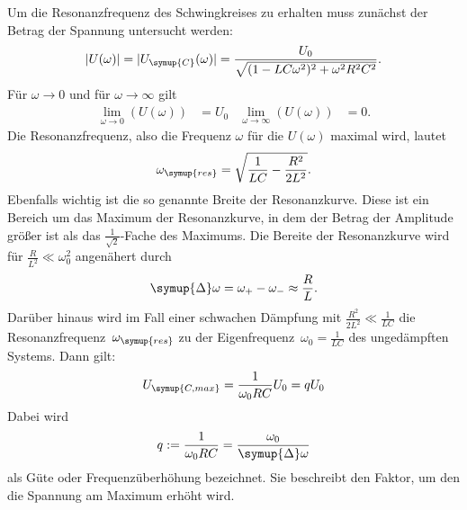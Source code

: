 Um die Resonanzfrequenz des Schwingkreises zu erhalten muss zunächst der Betrag der Spannung untersucht werden:
\begin{equation}
    |U(\omega)|=|U_{\symup{C}}(\omega)| = \frac{U_0}{\sqrt{(1-LC\omega^2)^2+\omega^2R^2C^2}}.
    \label{eq:Spannung}
\end{equation}
Für $\omega \to 0$ und für $\omega \to \infty$ gilt
\begin{align*}
    \lim \limits_{\omega \to 0} (U(\omega)) &= U_0 & \lim \limits_{\omega \to \infty} (U(\omega)) &= 0.
\end{align*}
Die Resonanzfrequenz, also die Frequenz $\omega$ für die $U(\omega)$ maximal wird, lautet
\begin{equation}
    \omega_{\symup{res}} = \sqrt{\frac{1}{LC}-\frac{R^2}{2L^2}}.
    \label{eq:Resonanzfrequenz}
\end{equation}
Ebenfalls wichtig ist die so genannte Breite der Resonanzkurve. Diese ist ein Bereich um das Maximum der Resonanzkurve,
in dem der Betrag der Amplitude größer ist als das $\frac{1}{\sqrt{2}}$-Fache des Maximums. Die Bereite der Resonanzkurve
wird für $\frac{R}{L^2} \ll \omega_0^2$ angenähert durch
\begin{equation}
    \symup{\Delta}\omega = \omega_{+}-\omega_{-} \approx \frac{R}{L}.
    \label{eq:Breite Resonanzkurve}
\end{equation}
Darüber hinaus wird im Fall einer schwachen Dämpfung mit $\frac{R^2}{2L^2} \ll \frac{1}{LC}$ die Resonanzfrequenz~$\omega_{\symup{res}}$ zu der 
Eigenfrequenz~$\omega_0=\frac{1}{LC}$ des ungedämpften Systems. Dann gilt:
\begin{equation}
    U_{\symup{C,max}} = \frac{1}{\omega_0 RC}U_0 = qU_0 \notag
\end{equation}
Dabei wird
\begin{equation}
    q:=\frac{1}{\omega_0 RC} = \frac{\omega_0}{\symup{\Delta}\omega}
    \label{eq:Güte}
\end{equation}
als Güte oder Frequenzüberhöhung bezeichnet. Sie beschreibt den Faktor, um den die Spannung am Maximum erhöht wird.